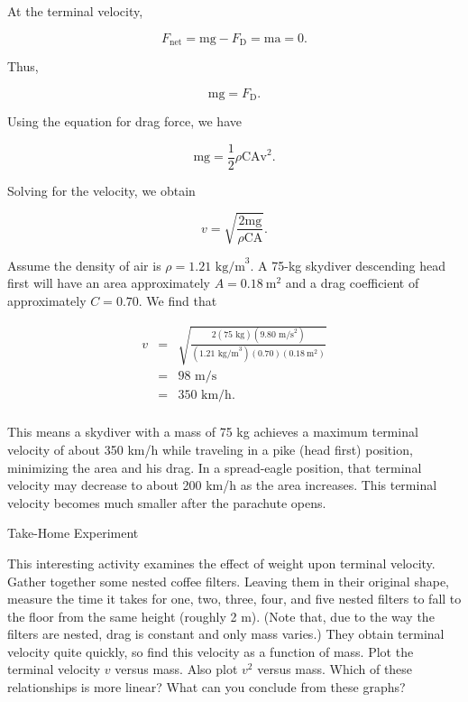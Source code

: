 \documentclass[
]{book}
\begin{document}
At the terminal velocity,

\leavevmode{}%
\[{{{{F_{\text{net}} = {\text{mg} - F_{\text{D}}}} = \text{ma}} = 0}\text{.}}{}\]

Thus,

\leavevmode{}%
\[{{\text{mg} = F_{\text{D}}}\text{.}}{}\]

Using the equation for drag force, we have

\leavevmode{}%
\[{{{\text{mg} = \frac{1}{2}}\rho\text{CAv}^{2}}.}{}\]

Solving for the velocity, we obtain

\leavevmode{}%
\[{{v = \sqrt{\frac{2\text{mg}}{\rho\text{CA}}}}.}{}\]

Assume the density of air is
\({{\rho = 1}\text{.}\text{21\ kg}\text{/m}^{3}}{}\). A 75-kg skydiver
descending head first will have an area approximately
\({{A = 0}\text{.}\text{18}\ \text{m}^{2}}{}\) and a drag coefficient of
approximately \({{C = 0}\text{.}\text{70}}{}\). We find that

\leavevmode{}%
\[\begin{array}{lll}
v & = & \sqrt{\frac{2(\text{75\ kg})(9\text{.80\ m}\text{/s}^{2})}{(1\text{.}\text{21\ kg}\text{/m}^{3})(0\text{.}\text{70})(\text{0.18}\ \text{m}^{2})}} \\
 & = & \text{98\ m/s} \\
 & = & {\text{350\ km/h}\text{.}} \\
\end{array}\]

This means a skydiver with a mass of 75 kg achieves a maximum terminal
velocity of about 350 km/h while traveling in a pike (head first)
position, minimizing the area and his drag. In a spread-eagle position,
that terminal velocity may decrease to about 200 km/h as the area
increases. This terminal velocity becomes much smaller after the
parachute opens.

\hypertarget{fs-id1165298779158}{}
Take-Home Experiment

This interesting activity examines the effect of weight upon terminal
velocity. Gather together some nested coffee filters. Leaving them in
their original shape, measure the time it takes for one, two, three,
four, and five nested filters to fall to the floor from the same height
(roughly 2 m). (Note that, due to the way the filters are nested, drag
is constant and only mass varies.) They obtain terminal velocity quite
quickly, so find this velocity as a function of mass. Plot the terminal
velocity \emph{\(v{}\)} versus mass. Also plot \emph{\(v^{2}{}\)} versus mass. Which
of these relationships is more linear? What can you conclude from these
graphs?
\end{document}
